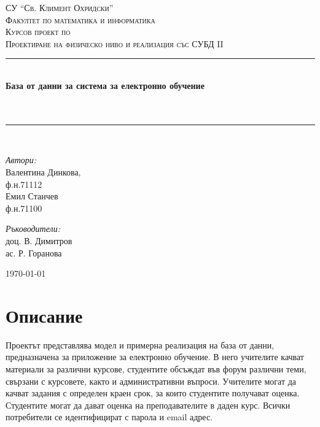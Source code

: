 \documentclass[a4paper,10pt, leqno]{article}
\newcommand{\HRule}{\rule{\linewidth}{0.5mm}}
\begin{document}
\begin{titlepage}
  \begin{center}
    \textsc{СУ ``Св. Климент Охридски''\\
    Факултет по математика и информатика
    }\\[5cm]

    \textsc{\large Курсов проект по \\
	   	   Проектиране на физическо ниво и реализация със СУБД II
    }\\[0.5cm]
    \HRule \\[0.4cm]
    { \Large \bfseries База от данни за система за електронно обучение\\ \\[0.4cm]
    }\\[0.4cm]
    \HRule \\[6cm]
    \begin{minipage}{0.49\textwidth}
      \begin{flushleft} \large
	\emph{Автори:}\\
	Валентина Динкова,\\
	{\small ф.н.71112}\\
	Емил Станчев\\
	{\small ф.н.71100}\\
      \end{flushleft}
    \end{minipage}
    \begin{minipage}{0.49\textwidth}
      \begin{flushright} \large
	\emph{Ръководители:} \\
	доц. В. Димитров\\
	ас. Р. Горанова
      \end{flushright}
    \end{minipage}
    \vfill
    {\large \today}
  \end{center}
\end{titlepage}

\tableofcontents
\newpage

	\section{Описание}
	  Проектът представлява модел и примерна реализация на база от данни, предназначена за приложение за електронно обучение.
	  В него учителите качват материали за различни курсове, студентите обсъждат във форум различни теми, свързани с курсовете,
	  както и	административни въпроси. Учителите могат да качват задания с определен краен срок, за които студентите получават оценка.
	  Студентите могат да дават оценка на преподавателите в даден курс. Всички потребители се идентифицират с парола и email адрес.
\end{document}
